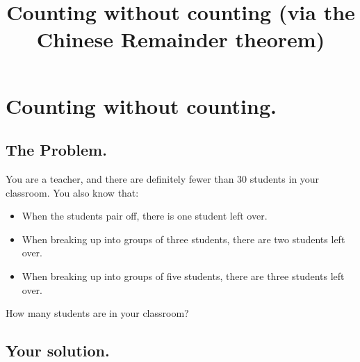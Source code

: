 \documentclass[12pt]{article}
\title{Counting without counting (via the Chinese Remainder theorem)}
\begin{document}
\section*{Counting without counting.}

\subsection*{The Problem.}

You are a teacher, and there are definitely fewer than 30 students in
your classroom.  You also know that:
\begin{itemize}
\item When the students pair off, there is one student left over.
\item When breaking up into groups of three students, there are two
  students left over.
\item When breaking up into groups of five students, there are three
  students left over.
\end{itemize}
How many students are in your classroom?

\subsection*{Your solution.}
\end{document}
